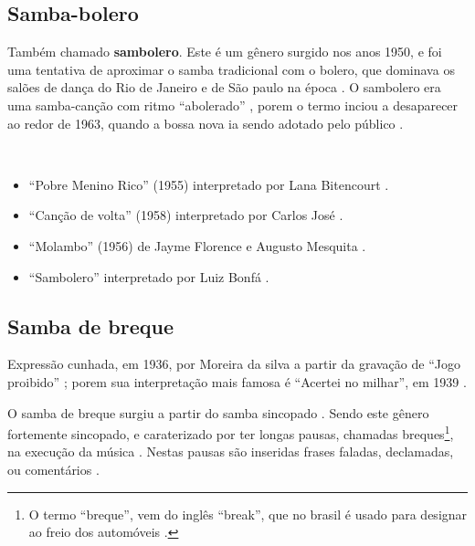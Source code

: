 \subsection{Samba-bolero}
Também chamado \textbf{sambolero}.
Este é um gênero surgido nos anos 1950, e foi uma tentativa de aproximar o samba tradicional com o bolero,
que dominava os salões de dança do Rio de Janeiro e de São paulo na época \cite[pp. 291]{dourado2004dicionario}.
O sambolero era uma samba-canção com ritmo ``abolerado'' \cite[pp. 685]{marcondes1977enciclopediav2},
porem o termo inciou a desaparecer ao redor de 1963, 
quando a bossa nova ia sendo adotado pelo público \cite[pp. 84]{biblioteca2006cultura}.

\begin{example} ~

\begin{itemize}
\item ``Pobre Menino Rico'' (1955) interpretado  por Lana Bitencourt \cite[pp. 5]{pobremeninorico}.
\item ``Canção de volta'' (1958) interpretado por Carlos José \cite[pp. 36]{carlosjose}.
\item ``Molambo'' (1956) de Jayme Florence e Augusto Mesquita \cite[pp. 481, 516]{faour2001bastidores}.
\item ``Sambolero'' interpretado por Luiz Bonfá \cite[pp. 49]{sambolero}.
\end{itemize}
\end{example}


\subsection{Samba de breque} 

Expressão cunhada, em 1936, por Moreira da silva a partir da gravação de ``Jogo proibido'' \cite[pp. 291]{dourado2004dicionario};
porem sua interpretação mais famosa é ``Acertei no milhar'', em 1939 \cite[pp. 129]{perna2002samba}.

O samba de breque surgiu a partir do samba sincopado \cite[pp. 129]{perna2002samba}.
Sendo este gênero fortemente sincopado, 
e caraterizado por ter longas pausas, chamadas breques\footnote{
O termo ``breque'', vem do inglês ``break'', 
que no brasil é usado para designar ao freio dos automóveis \cite[pp. 684]{marcondes1977enciclopediav2}.}, 
na execução da música \cite[pp. 291]{dourado2004dicionario}.
Nestas pausas são inseridas frases faladas, declamadas, ou comentários \cite[pp. 129]{perna2002samba} \cite[pp. 291]{dourado2004dicionario}. 


